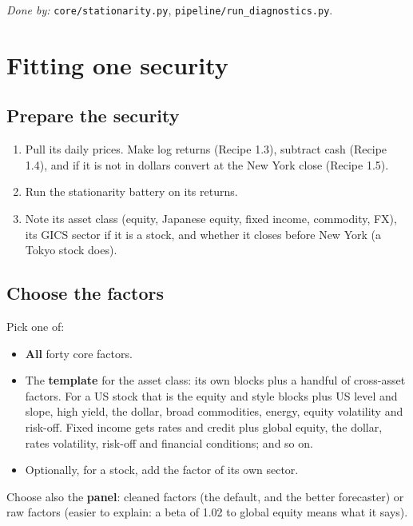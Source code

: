 \documentclass[11pt,a4paper]{article}
\newcommand{\doneby}[1]{\par{\raggedright\small\textit{Done by:} #1\par}}
\begin{document}
\doneby{\texttt{core/stationarity.py}, \texttt{pipeline/run\_diagnostics.py}.}

\section{Fitting one security}\label{part:fit}

\subsection{Prepare the security}

\begin{method}
\begin{enumerate}[leftmargin=1.4em]
  \item Pull its daily prices. Make log returns (Recipe 1.3), subtract cash (Recipe 1.4), and if it is not in dollars convert at the New York close (Recipe 1.5).
  \item Run the stationarity battery on its returns.
  \item Note its asset class (equity, Japanese equity, fixed income, commodity, FX), its GICS sector if it is a stock, and whether it closes before New York (a Tokyo stock does).
\end{enumerate}
\end{method}

\subsection{Choose the factors}

\begin{method}
Pick one of:
\begin{itemize}[leftmargin=1.2em]
  \item \textbf{All} forty core factors.
  \item The \textbf{template} for the asset class: its own blocks plus a handful of cross-asset factors. For a US stock that is the equity and style blocks plus US level and slope, high yield, the dollar, broad commodities, energy, equity volatility and risk-off. Fixed income gets rates and credit plus global equity, the dollar, rates volatility, risk-off and financial conditions; and so on.
  \item Optionally, for a stock, add the factor of its own sector.
\end{itemize}
Choose also the \textbf{panel}: cleaned factors (the default, and the better forecaster) or raw factors (easier to explain: a beta of 1.02 to global equity means what it says).
\end{method}
\end{document}
